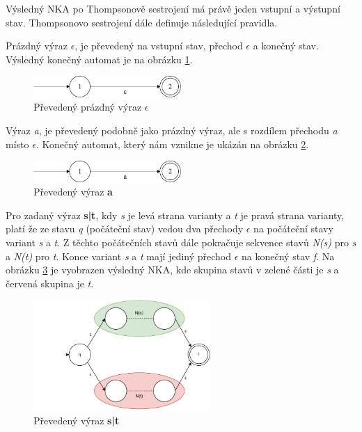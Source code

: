 Výsledný NKA po Thompsonově sestrojení má právě jeden vstupní a výstupní stav. 
Thompsonovo sestrojení dále definuje následující pravidla.

Prázdný výraz \textit{$\epsilon$}, je převedený na vstupní stav, přechod \textit{$\epsilon$} a konečný stav.
Výsledný konečný automat je na obrázku \ref{fig:NFAepsilon}.
\begin{figure}[!h]
	\centering
	\includegraphics[width=0.5\textwidth]{Figures/NFA_epsilon.pdf}
	\caption{Převedený prázdný výraz \textbf{$\epsilon$}}
	\label{fig:NFAepsilon}
\end{figure}

Výraz \textit{a}, je převedený podobně jako prázdný výraz, ale s rozdílem přechodu \textit{a} místo \textit{$\epsilon$}.
Konečný automat, který nám vznikne je ukázán na obrázku \ref{fig:NFAa}.
\begin{figure}[!h]
	\centering
	\includegraphics[width=0.5\textwidth]{Figures/NFA_a.pdf}
	\caption{Převedený výraz \textbf{a}}
	\label{fig:NFAa}
\end{figure}

Pro zadaný výraz \textbf{s|t}, kdy \textit{s} je levá strana varianty a \textit{t} je pravá strana varianty, platí že ze stavu \textit{q} (počáteční stav) vedou dva přechody
\textit{$\epsilon$} na počáteční stavy variant \textit{s} a \textit{t}. Z těchto počátečních stavů dále pokračuje sekvence stavů \textit{N(s)} pro \textit{s} a \textit{N(t)} pro \textit{t}.
Konce variant \textit{s} a \textit{t} mají jediný přechod \textit{$\epsilon$} na konečný stav \textit{f}.
Na obrázku \ref{fig:NFAunion} je vyobrazen výsledný NKA, 
kde skupina stavů v zelené části je \textit{s} a červená skupina je \textit{t}.
\begin{figure}[!h]
	\centering
	\includegraphics[width=0.6\textwidth]{Figures/NFA_union.pdf}
	\caption{Převedený výraz \textbf{s|t}}
	\label{fig:NFAunion}
\end{figure}

